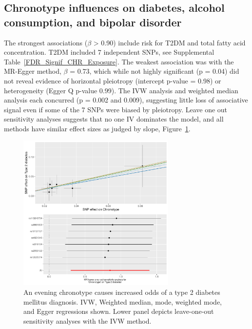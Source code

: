 \documentclass[journal,article,submit,moreauthors,pdftex]{Definitions/mdpi}
\begin{document}
\subsection{Chronotype influences on diabetes, alcohol consumption, and bipolar disorder}
The strongest associations ($\beta$ > 0.90) include risk for T2DM and total fatty acid concentration. T2DM included 7 independent SNPs, see Supplemental Table~\ref{FDR_Signif_CHR_Exposure}. The weakest association was with the MR-Egger method, $\beta$ = 0.73, which while not highly significant (p = 0.04) did not reveal evidence of horizontal pleiotropy (intercept p-value = 0.98) or heterogeneity (Egger Q p-value 0.99). The IVW analysis and weighted median analysis each concurred (p = 0.002 and 0.009), suggesting little loss of associative signal even if some of the 7 SNPs were biased by pleiotropy. Leave one out sensitivity analyses suggests that no one IV dominates the model, and all methods have similar effect sizes as judged by slope, Figure~\ref{t2dm}. 
\begin{figure}[htbp]
	\centering
         \includegraphics[width=0.7\textwidth]{Figs/Analysis2/Chronotype_vs_Type_2_diabetes.Plots.pdf}
    \caption{An evening chronotype causes increased odds of a type 2 diabetes mellitus diagnosis. IVW, Weighted median, mode, weighted mode, and Egger regressions shown. Lower panel depicts leave-one-out sensitivity analyses with the IVW method.}
	\label{t2dm}
\end{figure}
\end{document}
